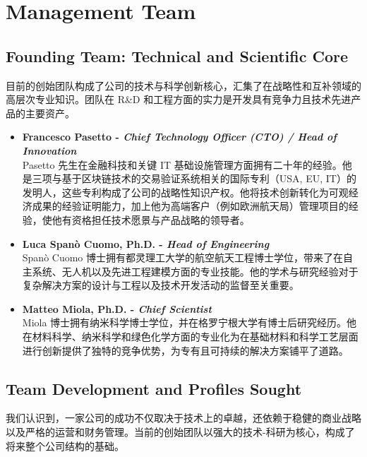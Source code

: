 \documentclass[11pt, a4paper, oneside]{article}
\begin{document}
\newpage
\section{Management Team}

\subsection{Founding Team: Technical and Scientific Core}

目前的创始团队构成了公司的技术与科学创新核心，汇集了在战略性和互补领域的高层次专业知识。团队在 R\&D 和工程方面的实力是开发具有竞争力且技术先进产品的主要资产。

\begin{itemize}
    \item \textbf{Francesco Pasetto - \textit{Chief Technology Officer (CTO) / Head of Innovation}} \\
    Pasetto 先生在金融科技和关键 IT 基础设施管理方面拥有二十年的经验。他是三项与基于区块链技术的交易验证系统相关的国际专利（USA, EU, IT）的发明人，这些专利构成了公司的战略性知识产权。他将技术创新转化为可观经济成果的经验证明能力，加上他为高端客户（例如欧洲航天局）管理项目的经验，使他有资格担任技术愿景与产品战略的领导者。

    \item \textbf{Luca Spanò Cuomo, Ph.D. - \textit{Head of Engineering}} \\
    Spanò Cuomo 博士拥有都灵理工大学的航空航天工程博士学位，带来了在自主系统、无人机以及先进工程建模方面的专业技能。他的学术与研究经验对于复杂解决方案的设计与工程以及技术开发活动的监督至关重要。

    \item \textbf{Matteo Miola, Ph.D. - \textit{Chief Scientist}} \\
    Miola 博士拥有纳米科学博士学位，并在格罗宁根大学有博士后研究经历。他在材料科学、纳米科学和绿色化学方面的专业化为在基础材料和科学工艺层面进行创新提供了独特的竞争优势，为专有且可持续的解决方案铺平了道路。
\end{itemize}



\subsection{Team Development and Profiles Sought}

我们认识到，一家公司的成功不仅取决于技术上的卓越，还依赖于稳健的商业战略以及严格的运营和财务管理。当前的创始团队以强大的技术-科研为核心，构成了将来整个公司结构的基础。
\end{document}
